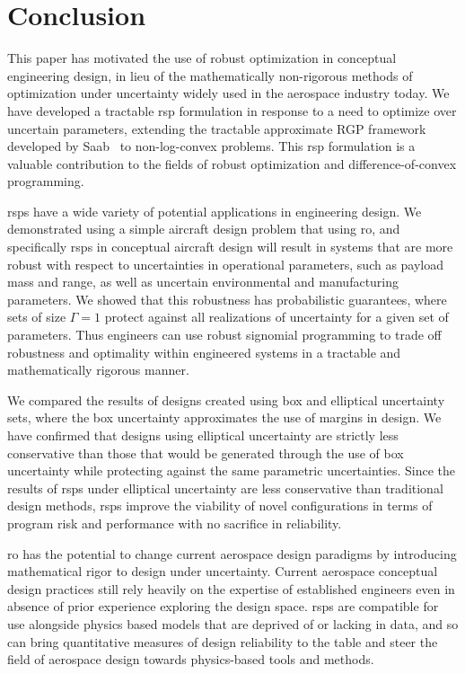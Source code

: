\section{Conclusion}

This paper has motivated the use of robust optimization in conceptual engineering
design, in lieu of the mathematically non-rigorous methods of optimization under uncertainty
widely used in the aerospace industry today. We have developed a tractable \gls{rsp} formulation
in response to a need to optimize over uncertain parameters, extending
the tractable approximate RGP framework developed by Saab~\cite{Saab2018} to non-log-convex problems.
This \gls{rsp} formulation is a valuable contribution to the fields of robust
optimization and difference-of-convex programming.

\gls{rsp}s have a wide variety of potential applications in engineering design.
We demonstrated using a simple aircraft design problem
that using \gls{ro}, and specifically \gls{rsp}s in conceptual aircraft design will result in systems
that are more robust with respect to uncertainties in operational parameters,
such as payload mass and range, as well as uncertain environmental and manufacturing parameters.
We showed that this robustness has probabilistic guarantees, where sets of size $\Gamma=1$
protect against all realizations of uncertainty for a given set of parameters.
Thus engineers can use robust signomial programming to trade off
robustness and optimality within engineered systems in a tractable and mathematically rigorous manner.

We compared the results of designs created using box and elliptical uncertainty sets, where the
box uncertainty approximates the use of margins in design. We
have confirmed that designs using elliptical uncertainty are strictly less conservative
than those that would be generated through the use of box uncertainty while protecting against the same
parametric uncertainties. Since the results of \gls{rsp}s under elliptical uncertainty are less conservative
than traditional design methods,
\gls{rsp}s improve the viability of novel configurations in terms of
program risk and performance with no sacrifice in reliability.

\gls{ro} has
the potential to change current aerospace design paradigms by introducing
mathematical rigor to design under uncertainty. Current aerospace
conceptual design practices still rely heavily on the expertise of established
engineers even in absence of prior experience exploring the design space.
\gls{rsp}s are compatible for use alongside physics based models
that are deprived of or lacking in data, and so can bring quantitative
measures of design reliability to the table and
steer the field of aerospace design towards physics-based tools and methods.

